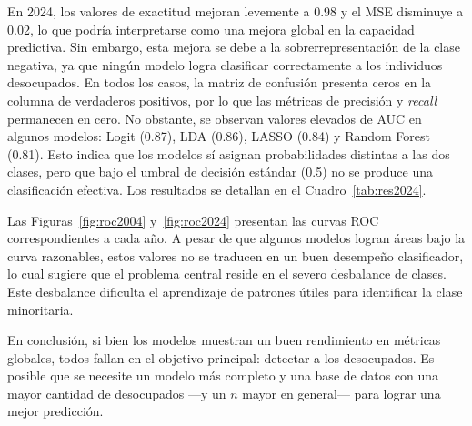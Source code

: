 \documentclass[11pt,a4paper]{article}
\begin{document}
En 2024, los valores de exactitud mejoran levemente a 0.98 y el MSE disminuye a 0.02, lo que
podría interpretarse como una mejora global en la capacidad predictiva. Sin embargo, esta
mejora se debe a la sobrerrepresentación de la clase negativa, ya que ningún modelo logra
clasificar correctamente a los individuos desocupados. En todos los casos, la matriz de
confusión presenta ceros en la columna de verdaderos positivos, por lo que las métricas de
precisión y \textit{recall} permanecen en cero. No obstante, se observan valores elevados de
AUC en algunos modelos: Logit (0.87), LDA (0.86), LASSO (0.84) y Random Forest (0.81). Esto
indica que los modelos sí asignan probabilidades distintas a las dos clases, pero que bajo el
umbral de decisión estándar (0.5) no se produce una clasificación efectiva. Los resultados se
detallan en el Cuadro~\ref{tab:res2024}.

Las Figuras~\ref{fig:roc2004} y~\ref{fig:roc2024} presentan las curvas ROC correspondientes a
cada año. A pesar de que algunos modelos logran áreas bajo la curva razonables, estos valores
no se traducen en un buen desempeño clasificador, lo cual sugiere que el problema central
reside en el severo desbalance de clases. Este desbalance dificulta el aprendizaje de patrones
útiles para identificar la clase minoritaria.

En conclusión, si bien los modelos muestran un buen rendimiento en métricas globales, todos
fallan en el objetivo principal: detectar a los desocupados. Es posible que se necesite un
modelo más completo y una base de datos con una mayor cantidad de desocupados ---y un $n$
mayor en general--- para lograr una mejor predicción.
\end{document}
